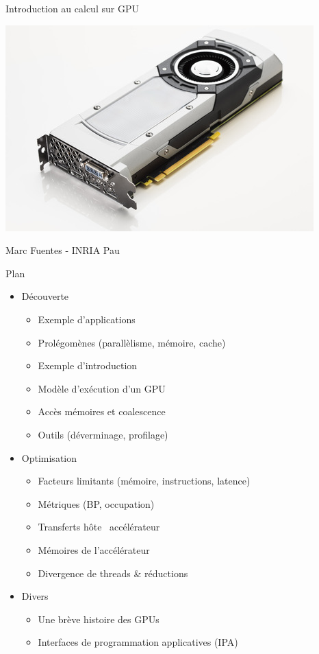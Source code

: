 \documentclass[11pt,mathserif]{beamer}
\newcommand{\geziBikoitz}{\faArrowsH}
\begin{document}
\begin{frame}
\begin{center}
  {\Large Introduction au calcul sur GPU }
\end{center}
\begin{center}
\includegraphics[width=0.5\linewidth]{fig/gpu.jpg}
\end{center}
 \begin{center}
{\large Marc Fuentes - INRIA Pau\\ }
\end{center}
\end{frame}

\begin{frame}{Plan}
\begin{itemize}[<+->]
   \item Découverte
     \begin{itemize}
       \item Exemple d'applications 
       \item Prolégomènes (parallèlisme, mémoire, cache)
       \item Exemple d'introduction
       \item Modèle d'exécution d'un GPU
       \item Accès mémoires et coalescence
       \item Outils (déverminage, profilage)
     \end{itemize}
 \item Optimisation 
     \begin{itemize}
       \item Facteurs limitants (mémoire, instructions, latence)
       \item Métriques (BP, occupation)
       \item Transferts hôte \geziBikoitz\ accélérateur
       \item Mémoires de l'accélérateur
       \item Divergence de threads \& réductions
     \end{itemize}
  \item Divers
     \begin{itemize}
       \item Une brève histoire des GPUs
       \item Interfaces de programmation applicatives (IPA)
     \end{itemize}
\end{itemize}
\end{frame}
\end{document}
